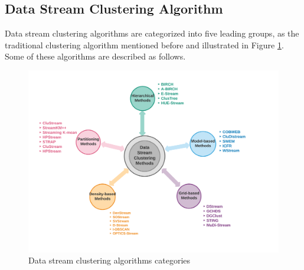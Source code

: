 \documentclass[../UNBThesis2.tex]{subfiles}
\begin{document}
\subsection{Data Stream Clustering Algorithm}
Data stream clustering algorithms are categorized into five leading groups, as the traditional clustering algorithm mentioned before and illustrated in Figure \ref{method}. Some of these algorithms are described as follows.


\begin{figure}
    \centering
    \includegraphics[width = 12 cm]{image/Chapters/Chapter2/streammethod.png}
    \caption{Data stream clustering algorithms categories}
    \label{method}
\end{figure}
\end{document}
